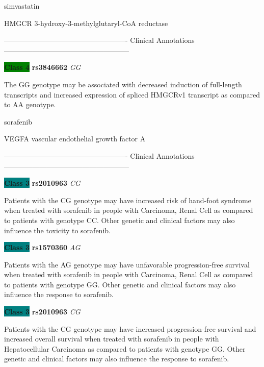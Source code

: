 \documentclass{resume} %
\begin{document}
\begin{rSection}{ simvastatin }
\begin{rSubsection}{ HMGCR }{ 3-hydroxy-3-methylglutaryl-CoA reductase }{}{}
\item[]

\item[] ---------------------------------------------------- Clinical Annotations -----------------------------------------------------\newline
\item \textbf{\colorbox{green} {Class 4}} \textbf{ rs3846662 } \textit{ GG }
\item[] The GG genotype may be associated with decreased induction of full-length transcripts and increased expression of spliced HMGCRv1 transcript  as compared to AA genotype.
\end{rSubsection}

\end{rSection}\begin{rSection}{ sorafenib }
\item[]

\begin{rSubsection}{ VEGFA }{ vascular endothelial growth factor A }{}{}
\item[]

\item[] ---------------------------------------------------- Clinical Annotations -----------------------------------------------------\newline
\item \textbf{\colorbox{teal} {Class 3}} \textbf{ rs2010963 } \textit{ CG }
\item[] Patients with the CG genotype may have increased risk of hand-foot syndrome when treated with sorafenib in people with Carcinoma, Renal Cell as compared to patients with genotype CC. Other genetic and clinical factors may also influence the toxicity to sorafenib.\item \textbf{\colorbox{teal} {Class 3}} \textbf{ rs1570360 } \textit{ AG }
\item[] Patients with the AG genotype may have unfavorable progression-free survival when treated with sorafenib in people with Carcinoma, Renal Cell as compared to patients with genotype GG. Other genetic and clinical factors may also influence the response to sorafenib.\item \textbf{\colorbox{teal} {Class 3}} \textbf{ rs2010963 } \textit{ CG }
\item[] Patients with the CG genotype may have increased progression-free survival and increased overall survival when treated with sorafenib in people with Hepatocellular Carcinoma as compared to patients with genotype GG. Other genetic and clinical factors may also influence the response to sorafenib.
\end{rSubsection}


\end{rSection}
\end{document}

